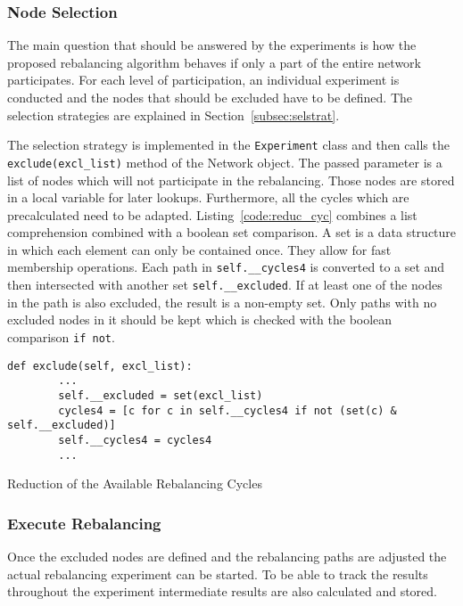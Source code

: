 \documentclass[final]{fhnwreport}       %
\begin{document}
\subsubsection{Node Selection}
The main question that should be answered by the experiments is how the proposed rebalancing algorithm behaves if only a part of the entire network participates. For each level of participation, an individual experiment is conducted and the nodes that should be excluded have to be defined. The selection strategies are explained in Section~\ref{subsec:selstrat}.

The selection strategy is implemented in the \texttt{Experiment} class and then calls the \texttt{exclude(excl_list)} method of the Network object. The passed parameter is a list of nodes which will not participate in the rebalancing. Those nodes are stored in a local variable for later lookups. Furthermore, all the cycles which are precalculated need to be adapted. Listing~\ref{code:reduc_cyc} combines a list comprehension combined with a boolean set comparison. A set is a data structure in which each element can only be contained once. They allow for fast membership operations. Each path in \texttt{self.__cycles4} is converted to a set and then intersected with another set \texttt{self.__excluded}. If at least one of the nodes in the path is also excluded, the result is a non-empty set. Only paths with no excluded nodes in it should be kept which is checked with the boolean comparison \texttt{if not}.  

\begin{listing}[H]
  \begin{verbatim}
def exclude(self, excl_list):
        ...
        self.__excluded = set(excl_list)
        cycles4 = [c for c in self.__cycles4 if not (set(c) & self.__excluded)]
        self.__cycles4 = cycles4
        ...
  \end{verbatim}
  \caption{Reduction of the Available Rebalancing Cycles}
  \label{code:reduc_cyc}
\end{listing}


\subsubsection{Execute Rebalancing}
Once the excluded nodes are defined and the rebalancing paths are adjusted the actual rebalancing experiment can be started. To be able to track the results throughout the experiment intermediate results are also calculated and stored. 
\end{document}
